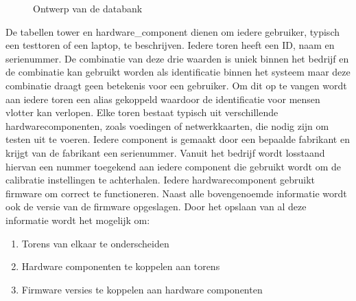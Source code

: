 \begin{figure}[!ht]
\centering
{}
\caption{Ontwerp van de databank}
\label{fig:databank}
\end{figure}

De tabellen tower en hardware\_component dienen om iedere gebruiker, typisch een testtoren of een laptop, te beschrijven.
Iedere toren heeft een ID, naam en serienummer.
De combinatie van deze drie waarden is uniek binnen het bedrijf en de combinatie kan gebruikt worden als identificatie binnen het systeem maar deze combinatie draagt geen betekenis voor een gebruiker.
Om dit op te vangen wordt aan iedere toren een alias gekoppeld waardoor de identificatie voor mensen vlotter kan verlopen.
Elke toren bestaat typisch uit verschillende hardwarecomponenten, zoals voedingen of netwerkkaarten, die nodig zijn om testen uit te voeren.
Iedere component is gemaakt door een bepaalde fabrikant en krijgt van de fabrikant een serienummer.
Vanuit het bedrijf wordt losstaand hiervan een nummer toegekend aan iedere component die gebruikt wordt om de calibratie instellingen te achterhalen.
Iedere hardwarecomponent gebruikt firmware om correct te functioneren.
Naast alle bovengenoemde informatie wordt ook de versie van de firmware opgeslagen.
Door het opslaan van al deze informatie wordt het mogelijk om:
\begin{enumerate}
\item Torens van elkaar te onderscheiden
\item Hardware componenten te koppelen aan torens
\item Firmware versies te koppelen aan hardware componenten
\end{enumerate}

